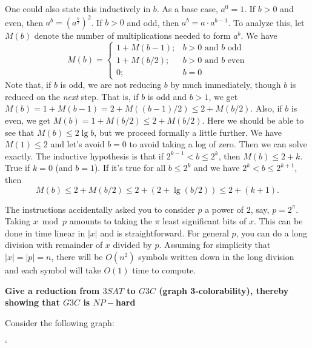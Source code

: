 \documentclass[2pt,legalpaper]{scrartcl}
\begin{document}
\begin{multicols}{6}
  One could also state this inductively in $b$.  As a base case,
  $a^0=1$.  If $b>0$ and even, then
  $a^b=\left(a^{\frac b2}\right)^2$.  If $b>0$ and odd, then
  $a^b=a\cdot a^{b-1}$.  To analyze this, let $M(b)$ denote the number
  of multiplications needed to form $a^b$.  We have
  \[
    M(b)=
    \left\{
      \begin{array}{ll}
        1+M(b-1); & \mbox{$b>0$ and $b$ odd}\\
        1+M(b/2); & \mbox{$b>0$ and $b$ even}\\
               0; & \mbox{$b=0$}
      \end{array}
      \right.
    \]
    Note that, if $b$ is odd, we are not reducing $b$ by much immediately,
    though $b$ is reduced on the {\em next} step.  That is, if $b$ is odd
    and $b>1$, we get $M(b)=1+M(b-1)=2+M((b-1)/2)\le 2+M(b/2)$.  Also, if
    $b$ is even, we get $M(b)=1+M(b/2)\le2+M(b/2)$.  Here we should be
    able to see that $M(b)\le 2\lg b$, but we proceed formally a little
    further.  We have $M(1)\le 2$ and
    let's avoid $b=0$ to avoid taking a log of zero.  Then we can solve
    exactly.  The inductive hypothesis is that if $2^{k-1}<b\le 2^k$, then
    $M(b)\le 2+k$.  True if $k=0$ (and $b=1$).  If it's true for all $b\le
    2^k$ and we have $2^k<b\le 2^{k+1}$, then
    \[M(b)\le 2+M(b/2)\le2+(2+\lg(b/2))\le 2+(k+1).\]

    The instructions accidentally asked you to consider $p$ a power of 2,
    say, $p=2^\pi$.  Taking $x\bmod p$ amounts to taking the $\pi$ least
    significant bits of $x$.  This can be done in time linear in $|x|$ and
    is straightforward.  For general $p$, you can do a long division with
    remainder of $x$ divided by $p$.  Assuming for simplicity that
    $|x|=|p|=n$, there will be $O(n^2)$ symbols written down in the long
    division and each symbol will take $O(1)$ time to compute.

    {\bf Give a reduction from $3SAT$ to $G3C$ (graph 3-colorability), thereby showing that $G3C$ is $NP-$hard}

    Consider the following graph:

    \begin{center}
      `
\end{center}
\end{multicols}
\end{document}
